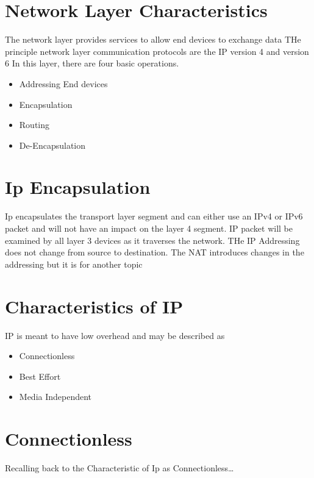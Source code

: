 \documentclass{article}
\begin{document}
\section{\textbf{Network Layer Characteristics}}

The network layer provides services to allow end devices to exchange data
THe principle network layer communication protocols are the IP version 4 and version 6
In this layer, there are four basic operations.

\begin{itemize}
    \item Addressing End devices
    \item Encapsulation
    \item Routing
    \item De-Encapsulation
    
\end{itemize}

\section{\textbf{Ip Encapsulation}}

Ip encapsulates the transport layer segment and can either use an IPv4 or IPv6
packet and will not have an impact on the layer 4 segment. IP packet will be examined by all
layer 3 devices as it traverses the network. THe IP Addressing does not change from source to 
destination. The NAT introduces changes in the addressing but it is for another topic

\section{\textbf{Characteristics of IP}}

IP is meant to have low overhead and may be described as 

\begin{itemize}
    \item Connectionless
    \item Best Effort
    \item Media Independent
\end{itemize}

\section{\textbf{Connectionless}}

Recalling back to the Characteristic of Ip as Connectionless\dots
\end{document}
